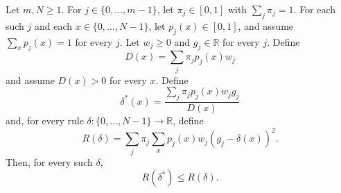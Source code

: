 \begin{theorem}
Let $m,N\geq1$. For $j\in\{0,\ldots,m-1\}$, let
$\pi_j\in[0,1]$ with $\sum_j\pi_j=1$. For each such $j$ and each
$x\in\{0,\ldots,N-1\}$, let $p_j(x)\in[0,1]$, and assume
$\sum_xp_j(x)=1$ for every $j$. Let $w_j\geq0$ and $g_j\in\mathbb R$ for
every $j$. Define
\[
 D(x)=\sum_j\pi_jp_j(x)w_j
\]
and assume $D(x)>0$ for every $x$. Define
\[
 \delta^*(x)=\frac{\sum_j\pi_jp_j(x)w_jg_j}{D(x)}
\]
and, for every rule $\delta:\{0,\ldots,N-1\}\to\mathbb R$, define
\[
 R(\delta)=\sum_j\pi_j\sum_xp_j(x)w_j(g_j-\delta(x))^2.
\]
Then, for every such $\delta$,
\[
 R(\delta^*)\leq R(\delta).
\]
\end{theorem}
